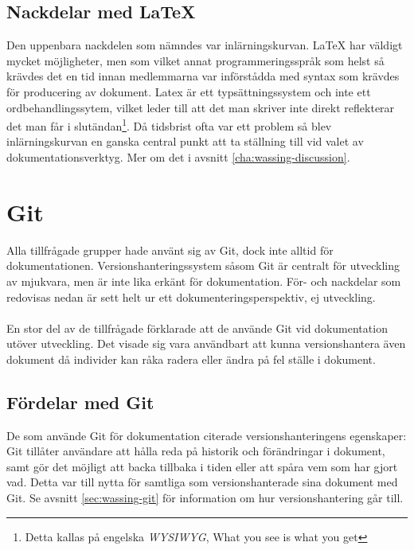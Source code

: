 \subsection{Nackdelar med LaTeX}
Den uppenbara nackdelen som nämndes var inlärningskurvan. LaTeX har väldigt mycket möjligheter, men som vilket annat programmeringsspråk som helst så krävdes det en tid innan medlemmarna var införstådda med syntax som krävdes för producering av dokument. Latex är ett typsättningssystem och inte ett ordbehandlingssytem, vilket leder till att det man skriver inte direkt reflekterar det man får i slutändan\footnote{Detta kallas på engelska \textit{WYSIWYG}, What you see is what you get}. Då tidsbrist ofta var ett problem så blev inlärningskurvan en ganska central punkt att ta ställning till vid valet av dokumentationsverktyg. Mer om det i avsnitt \ref{cha:wassing-discussion}. 

\section{Git}
\label{sec:wassing-gitresults}
Alla tillfrågade grupper hade använt sig av Git, dock inte alltid för dokumentationen. Versionshanteringssystem såsom Git är centralt för utveckling av mjukvara, men är inte lika erkänt för dokumentation. För- och nackdelar som redovisas nedan är sett helt ur ett dokumenteringsperspektiv, ej utveckling.
\\ \\
En stor del av de tillfrågade förklarade att de använde Git vid dokumentation utöver utveckling. Det visade sig vara användbart att kunna versionshantera även dokument då individer kan råka radera eller ändra på fel ställe i dokument.

\subsection{Fördelar med Git}
De som använde Git för dokumentation citerade versionshanteringens egenskaper: Git tillåter användare att hålla reda på historik och förändringar i dokument, samt gör det möjligt att backa tillbaka i tiden eller att spåra vem som har gjort vad. Detta var till nytta för samtliga som versionshanterade sina dokument med Git. Se avsnitt \ref{sec:wassing-git} för information om hur versionshantering går till.

